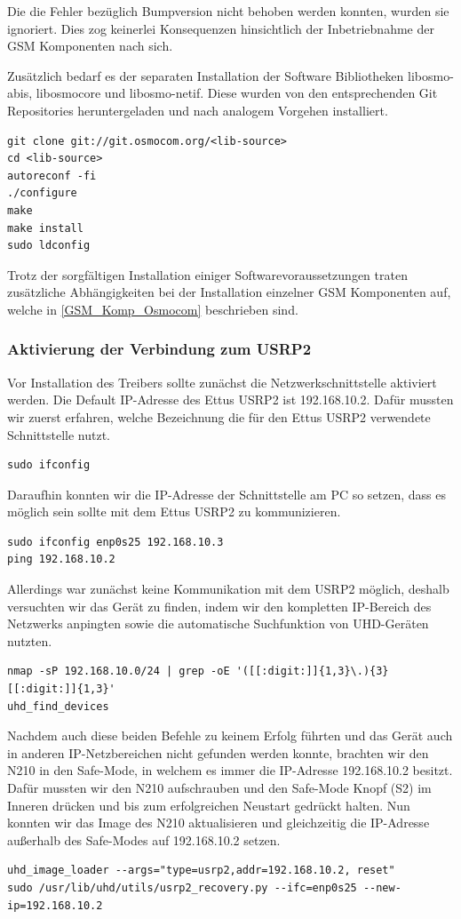 Die die Fehler bezüglich Bumpversion nicht behoben werden konnten, wurden sie ignoriert. Dies zog keinerlei Konsequenzen hinsichtlich der Inbetriebnahme der GSM Komponenten nach sich.

Zusätzlich bedarf es der separaten Installation der Software Bibliotheken libosmo-abis, libosmocore und libosmo-netif. Diese wurden von den entsprechenden Git Repositories heruntergeladen und nach analogem Vorgehen installiert.

\begin{lstlisting}
git clone git://git.osmocom.org/<lib-source>
cd <lib-source>
autoreconf -fi
./configure
make
make install
sudo ldconfig
\end{lstlisting}

Trotz der sorgfältigen Installation einiger Softwarevoraussetzungen traten zusätzliche Abhängigkeiten bei der Installation einzelner GSM Komponenten auf, welche in \ref{GSM_Komp_Osmocom} beschrieben sind.

\subsubsection{Aktivierung der Verbindung zum USRP2}\label{usrp2_connect}
Vor Installation des Treibers sollte zunächst die Netzwerkschnittstelle aktiviert werden. Die Default IP-Adresse des Ettus USRP2 ist 192.168.10.2. Dafür mussten wir zuerst erfahren, welche Bezeichnung die für den Ettus USRP2 verwendete Schnittstelle nutzt.
\begin{lstlisting}
sudo ifconfig
\end{lstlisting}

Daraufhin konnten wir die IP-Adresse der Schnittstelle am PC so setzen, dass es möglich sein sollte mit dem Ettus USRP2 zu kommunizieren.
\begin{lstlisting}
sudo ifconfig enp0s25 192.168.10.3
ping 192.168.10.2
\end{lstlisting}

Allerdings war zunächst keine Kommunikation mit dem USRP2 möglich, deshalb versuchten wir das Gerät zu finden, indem wir den kompletten IP-Bereich des Netzwerks anpingten sowie die automatische Suchfunktion von UHD-Geräten nutzten.
\begin{lstlisting}
nmap -sP 192.168.10.0/24 | grep -oE '([[:digit:]]{1,3}\.){3}[[:digit:]]{1,3}'
uhd_find_devices
\end{lstlisting}

Nachdem auch diese beiden Befehle zu keinem Erfolg führten und das Gerät auch in anderen IP-Netzbereichen nicht gefunden werden konnte, brachten wir den N210 in den Safe-Mode, in welchem es immer die IP-Adresse 192.168.10.2 besitzt. Dafür mussten wir den N210 aufschrauben und den Safe-Mode Knopf (S2) im Inneren drücken und bis zum erfolgreichen Neustart gedrückt halten. Nun konnten wir das Image des N210 aktualisieren und gleichzeitig die IP-Adresse außerhalb des Safe-Modes auf 192.168.10.2 setzen.
\begin{lstlisting}
uhd_image_loader --args="type=usrp2,addr=192.168.10.2, reset"
sudo /usr/lib/uhd/utils/usrp2_recovery.py --ifc=enp0s25 --new-ip=192.168.10.2
\end{lstlisting}

